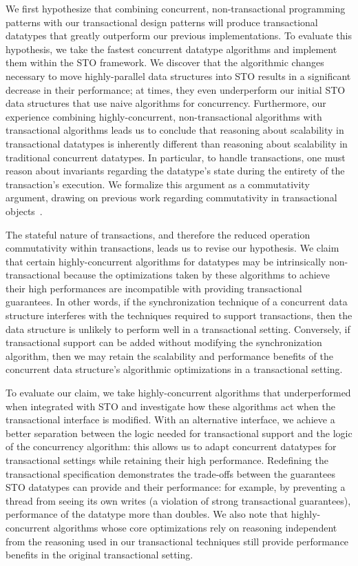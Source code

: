 We first hypothesize that combining concurrent, non-transactional programming patterns with our transactional design patterns will produce transactional datatypes that greatly outperform our previous implementations. To evaluate this hypothesis, we take the fastest concurrent datatype algorithms and implement them within the STO framework. We discover that the algorithmic changes necessary to move highly-parallel data structures into STO results in a significant decrease in their performance; at times, they even underperform our initial STO data structures that use naive algorithms for concurrency.
Furthermore, our experience combining highly-concurrent, non-transactional algorithms with transactional algorithms leads us to conclude that reasoning about scalability in transactional datatypes is inherently different than reasoning about scalability in traditional concurrent datatypes. In particular, to handle transactions, one must reason about invariants regarding the datatype's state during the entirety of the transaction's execution. We formalize this argument as a commutativity argument, drawing on previous work regarding commutativity in transactional objects~\cite{weihl}.

The stateful nature of transactions, and therefore the reduced operation commutativity within transactions, leads us to revise our hypothesis. 
We claim that certain highly-concurrent algorithms for datatypes may be intrinsically non-transactional because the optimizations taken by these algorithms to achieve their high performances are incompatible with providing transactional guarantees. In other words, if the synchronization technique of a concurrent data structure interferes with the techniques required to support transactions, then the data structure is unlikely to perform well in a transactional setting. Conversely, if transactional support can be added without modifying the synchronization algorithm, then we may retain the scalability and performance benefits of the concurrent data structure's algorithmic optimizations in a transactional setting.

To evaluate our claim, we take highly-concurrent algorithms that underperformed when integrated with STO and investigate how these algorithms act when the transactional interface is modified. 
With an alternative interface, we achieve a better separation between the logic needed for transactional support and the logic of the concurrency algorithm: this allows us to adapt concurrent datatypes for transactional settings while retaining their high performance.
Redefining the transactional specification demonstrates the trade-offs between the guarantees STO datatypes can provide and their performance: for example, by preventing a thread from seeing its own writes (a violation of strong transactional guarantees), performance of the datatype more than doubles.
We also note that highly-concurrent algorithms whose core optimizations rely on reasoning independent from the reasoning used in our transactional techniques still provide performance benefits in the original transactional setting.


